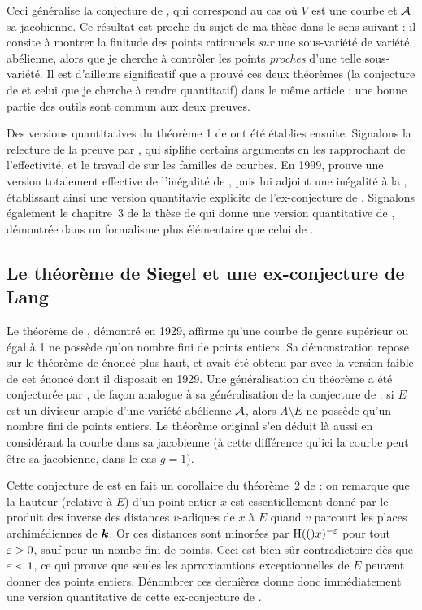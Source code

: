 \documentclass[a4paper, 11pt]{article}
\begin{document}
Ceci généralise la conjecture de , qui correspond au cas où $V$
est une courbe et $\mathcal A$ sa jacobienne. Ce résultat est proche du sujet de ma
thèse dans le sens suivant : il consite à montrer la finitude des points
rationnels \emph{sur} une sous-variété de variété abélienne, alors que je
cherche à contrôler les points \emph{proches} d'une telle sous-variété. Il est
d'ailleurs significatif que  a prouvé ces deux théorèmes (la
conjecture de  et celui que je cherche à rendre quantitatif)
dans le même article : une bonne partie des outils sont commun aux deux
preuves.

Des versions quantitatives du théorème 1 de  ont été établies
ensuite. Signalons la relecture de la preuve par , qui siplifie
certains arguments en les rapprochant de l'effectivité, et le travail de
 sur les familles de courbes. En 1999,  prouve une
version totalement effective de l'inégalité de , puis lui adjoint
une inégalité à la , établissant ainsi une version quantitavie
explicite de l'ex-conjecture de . Signalons également le
chapitre~3 de la thèse de  qui donne une version quantitative de
, démontrée dans un formalisme plus élémentaire que celui de
.

\subsection{Le théorème de Siegel et une ex-conjecture de Lang}
\label{s-siegel}

Le théorème de , démontré en 1929, affirme qu'une courbe de genre
supérieur ou égal à 1 ne possède qu'on nombre fini de points entiers. Sa
démonstration repose sur le théorème de  énoncé plus haut, et avait
été obtenu par  avec la version faible de cet énoncé dont il
disposait en 1929.  Une généralisation du théorème a été conjecturée par
, de façon analogue à sa généralisation de la conjecture de
 : si $E$ est un diviseur ample d'une variété abélienne $\mathcal A$,
alors $A \setminus E$ ne possède qu'un nombre fini de points entiers. Le
théorème original s'en déduit là aussi en considérant la courbe dans sa
jacobienne (à cette différence qu'ici la courbe peut être sa jacobienne, dans
le cas $g=1$).

Cette conjecture de  est en fait un corollaire du théorème~2 de
 : on remarque que la hauteur (relative à $E$) d'un point
entier $x$ est essentiellement donné par le produit des inverse des distances
$v$-adiques de $x$ à $E$ quand $v$ parcourt les places archimédiennes de
$\boldsymbol{k}$. Or ces distances sont minorées par $\operatorname{H}(()x)^{-\varepsilon}$ pour tout
$\varepsilon>0$, sauf pour un nombe fini de points. Ceci est bien sûr contradictoire
dès que $\varepsilon < 1$, ce qui prouve que seules les aprroxiamtions
exceptionnelles de $E$ peuvent donner des points entiers. Dénombrer ces
dernières donne donc immédiatement une version quantitative de cette
ex-conjecture de .
\end{document}
